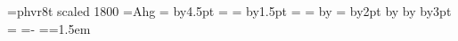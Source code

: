 
\font\rm=phvr8t scaled 1800
\rm
=\hbox{Ahg}%
\riseheight=
\advance\riseheight by4.5pt               %
=                              %
\holddepth= \advance\holddepth by1.5pt    %
\holdthick=1.44pt                                %
\holdgap=4pt                                     %
=\hbox{\markfont\diagup}%
=                              %
\advance{} by\riseheight             %
\topskip= \advance\topskip by2pt   %
\advance{} by\holddepth              %
\advance{} by\holdthick              %
\advance{} by3pt                     %
\baselineskip=
\lineskiplimit=-\maxdimen                 %
\parindent=0pt
\everypar={\hangindent=1.5em  }
